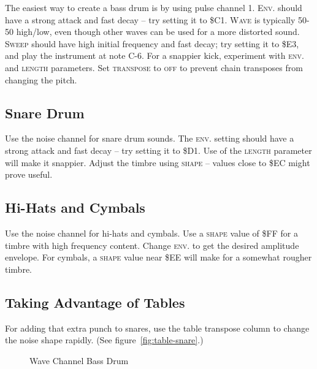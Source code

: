 The easiest way to create a bass drum is by using pulse channel 1. \textsc{Env.} should have a strong attack and fast decay -- try setting it to \$C1. \textsc{Wave} is typically 50-50 high/low, even though other waves can be used for a more distorted sound. \textsc{Sweep} should have high initial frequency and fast decay; try setting it to \$E3, and play the instrument at note C-6. For a snappier kick, experiment with \textsc{env.} and \textsc{length} parameters. Set \textsc{transpose} to \textsc{off} to prevent chain transposes from changing the pitch.

\subsection{Snare Drum}

Use the noise channel for snare drum sounds. The \textsc{env.} setting should have a strong attack and fast decay -- try setting it to \$D1. Use of the \textsc{length} parameter will make it snappier. Adjust the timbre using \textsc{shape} -- values close to \$EC might prove useful.

\subsection{Hi-Hats and Cymbals}

Use the noise channel for hi-hats and cymbals. Use a \textsc{shape} value of \$FF for a timbre with high frequency content. Change \textsc{env.} to get the desired amplitude envelope. For cymbals, a \textsc{shape} value near \$EE will make for a somewhat rougher timbre.

\subsection{Taking Advantage of Tables}

For adding that extra punch to snares, use the table transpose column to change the noise shape rapidly. (See figure~\ref{fig:table-snare}.)

\begin{figure}[hbtp]
	\centering
	\qquad

	\qquad

	\caption{Wave Channel Bass Drum}
	\label{fig:wavekick}
\end{figure}

